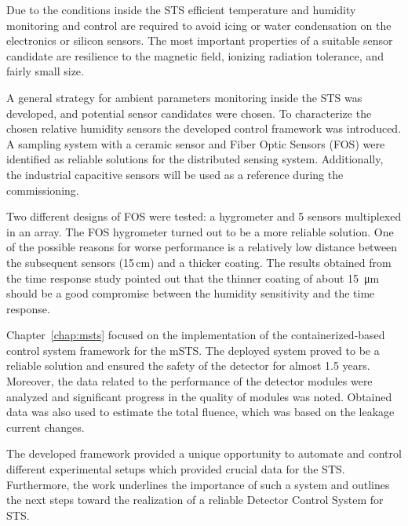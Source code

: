 Due to the conditions inside the \gls{STS} efficient temperature and humidity monitoring and control are required to avoid icing or water condensation on the electronics or silicon sensors. The most important properties of a suitable sensor candidate are resilience to the magnetic field, ionizing radiation tolerance, and fairly small size.

A general strategy for ambient parameters monitoring inside the \gls{STS} was developed, and potential sensor candidates were chosen. To characterize the chosen relative humidity sensors the developed control framework was introduced. A sampling system with a ceramic sensor and Fiber Optic Sensors (\gls{FOS}) were identified as reliable solutions for the distributed sensing system. Additionally, the industrial capacitive sensors will be used as a reference during the commissioning.

Two different designs of \gls{FOS} were tested: a hygrometer and 5 sensors multiplexed in an array. The \gls{FOS} hygrometer turned out to be a more reliable solution. One of the possible reasons for worse performance is a relatively low distance between the subsequent sensors (15\,cm) and a thicker coating. The results obtained from the time response study pointed out that the thinner coating of about \SI{15}{\micro\metre} should be a good compromise between the humidity sensitivity and the time response. 

Chapter~\ref{chap:msts} focused on the implementation of the containerized-based control system framework for the \gls{mSTS}. The deployed system proved to be a reliable solution and ensured the safety of the detector for almost 1.5 years. Moreover, the data related to the performance of the detector modules were analyzed and significant progress in the quality of modules was noted. Obtained data was also used to estimate the total fluence, which was based on the leakage current changes. 

The developed framework provided a unique opportunity to automate and control different experimental setups which provided crucial data for the \gls{STS}. Furthermore, the work underlines the importance of such a system and outlines the next steps toward the realization of a reliable Detector Control System for \gls{STS}.
